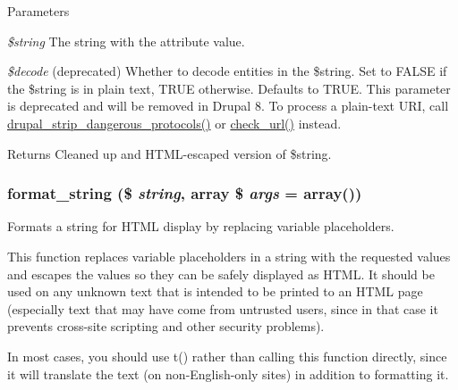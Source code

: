 \begin{DoxyParams}{Parameters}
\item[{\em \$string}]The string with the attribute value. \item[{\em \$decode}](deprecated) Whether to decode entities in the \$string. Set to FALSE if the \$string is in plain text, TRUE otherwise. Defaults to TRUE. This parameter is deprecated and will be removed in Drupal 8. To process a plain-\/text URI, call \hyperlink{group__sanitization_ga46ff2822d576a77317f9045d65317b4f}{drupal\_\-strip\_\-dangerous\_\-protocols()} or \hyperlink{group__sanitization_gac024315b69035ef05c33674838707919}{check\_\-url()} instead.\end{DoxyParams}
\begin{DoxyReturn}{Returns}
Cleaned up and HTML-\/escaped version of \$string. 
\end{DoxyReturn}
\hypertarget{group__sanitization_ga8da272cf93fb6ba229eca7c0b06ea4d2}{
\subsubsection[{format\_\-string}]{\setlength{\rightskip}{0pt plus 5cm}format\_\-string (\$ {\em string}, \/  array \$ {\em args} = {\ttfamily array()})}}
\label{group__sanitization_ga8da272cf93fb6ba229eca7c0b06ea4d2}
Formats a string for HTML display by replacing variable placeholders.

This function replaces variable placeholders in a string with the requested values and escapes the values so they can be safely displayed as HTML. It should be used on any unknown text that is intended to be printed to an HTML page (especially text that may have come from untrusted users, since in that case it prevents cross-\/site scripting and other security problems).

In most cases, you should use t() rather than calling this function directly, since it will translate the text (on non-\/English-\/only sites) in addition to formatting it.


